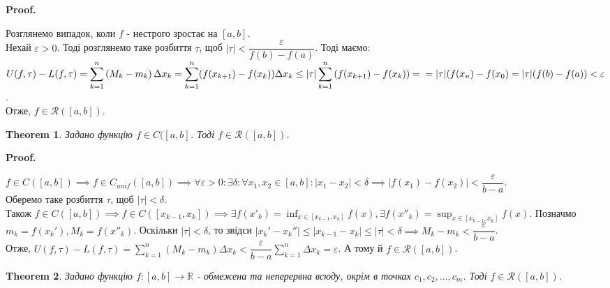 \documentclass[a4paper, 10pt]{article}
\makeatletter
\def\huge{\displaystyle}
\def\qed{$\blacksquare$}
\theoremstyle{theoremdd}
\newtheorem{theorem}{Theorem}[subsection]
\theoremstyle{theoremdd}
\theoremstyle{theoremdd}
\theoremstyle{theoremdd}
\theoremstyle{theoremdd}
\theoremstyle{theoremdd}
\theoremstyle{theoremdd}
\theoremstyle{theoremdd}
\renewenvironment{proof}[1][Proof.\\]{\par
\pushQED{\hfill \qed}%
\normalfont \topsep6\p@\@plus6\p@\relax
\trivlist
\item\relax
{\bfseries
#1\@addpunct{.}}\hspace\labelsep\ignorespaces
}{%
\popQED\endtrivlist\@endpefalse
}
\makeatother
\begin{document}
\begin{proof}
Розглянемо випадок, коли $f$ - нестрого зростає на $[a,b]$.\\
Нехай $\varepsilon > 0$. Тоді розглянемо таке розбиття $\tau$, щоб $|\tau| < \dfrac{\varepsilon}{f(b)-f(a)}$. Тоді маємо:\\
$U(f,\tau) - L(f,\tau) = \huge\sum_{k=1}^n \left( M_k - m_k \right) \Delta x_k = \sum_{k=1}^n (f(x_{k+1})-f(x_k))\Delta x_k \leq |\tau| \huge\sum_{k=1}^{n} \left( f(x_{k+1})-f(x_k) \right) = \\ = |\tau| (f(x_n)-f(x_0) = |\tau| (f(b)-f(a)) < \varepsilon$.\\
Отже, $f \in \mathcal{R}([a,b])$.
\end{proof}

\begin{theorem}
Задано функцію $f \in C([a,b]$. Тоді $f \in \mathcal{R}([a,b])$.
\end{theorem}

\begin{proof}
$f \in C([a,b]) \implies f \in C_{unif}([a,b]) \implies \forall \varepsilon > 0: \exists \delta: \forall x_1,x_2 \in [a,b]: |x_1-x_2| < \delta \implies |f(x_1)-f(x_2)| < \dfrac{\varepsilon}{b-a}$.\\
Оберемо таке розбиття $\tau$, щоб $|\tau| < \delta$.\\
Також $f \in C([a,b]) \implies f \in C([x_{k-1},x_k]) \implies \huge \exists f(x'_k) = \inf_{x \in [x_{k-1},x_k]} f(x), \exists f(x''_k) = \sup_{x \in [x_{k-1},x_k]} f(x)$. Позначмо $m_k = f(x_k'), M_k = f(x''_k)$. Оскільки $|\tau| < \delta$, то звідси $|x_k'-x_k''| \leq |x_{k-1}-x_k| \leq |\tau| < \delta \implies M_k - m_k < \dfrac{\varepsilon}{b-a}$.\\
Отже, $U(f,\tau) - L(f,\tau) = \huge\sum_{k=1}^n (M_k-m_k)\Delta x_k < \dfrac{\varepsilon}{b-a} \sum_{k=1}^n \Delta x_k = \varepsilon$. А тому й $f \in \mathcal{R}([a,b])$.
\end{proof}

\begin{theorem}
Задано функцію $f: [a,b] \to \mathbb{R}$ - обмежена та неперервна всюду, окрім в точках $c_1,c_2,\dots,c_m$. Тоді $f \in \mathcal{R}([a,b])$.
\end{theorem}
\end{document}
